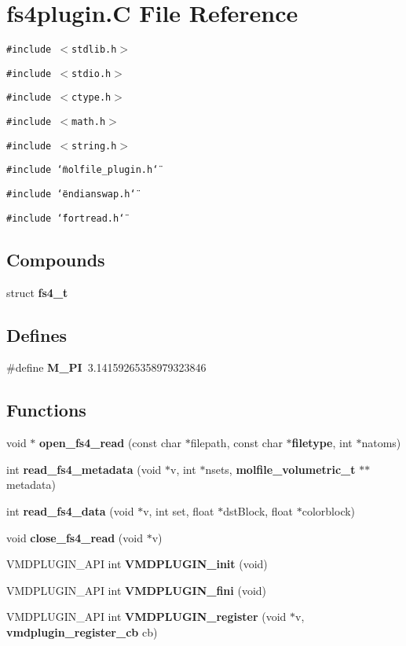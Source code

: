 \section{fs4plugin.C File Reference}
\label{fs4plugin_8C}
{\tt \#include $<$stdlib.h$>$}\par
{\tt \#include $<$stdio.h$>$}\par
{\tt \#include $<$ctype.h$>$}\par
{\tt \#include $<$math.h$>$}\par
{\tt \#include $<$string.h$>$}\par
{\tt \#include \char`\"{}molfile\_\-plugin.h\char`\"{}}\par
{\tt \#include \char`\"{}endianswap.h\char`\"{}}\par
{\tt \#include \char`\"{}fortread.h\char`\"{}}\par
\subsection*{Compounds}
\begin{CompactItemize}
\item 
struct {\bf fs4\_\-t}
\end{CompactItemize}
\subsection*{Defines}
\begin{CompactItemize}
\item 
\#define {\bf M\_\-PI}\ 3.14159265358979323846
\end{CompactItemize}
\subsection*{Functions}
\begin{CompactItemize}
\item 
void $\ast$ {\bf open\_\-fs4\_\-read} (const char $\ast$filepath, const char $\ast${\bf filetype}, int $\ast$natoms)
\item 
int {\bf read\_\-fs4\_\-metadata} (void $\ast$v, int $\ast$nsets, {\bf molfile\_\-volumetric\_\-t} $\ast$$\ast$metadata)
\item 
int {\bf read\_\-fs4\_\-data} (void $\ast$v, int set, float $\ast$dst\-Block, float $\ast$colorblock)
\item 
void {\bf close\_\-fs4\_\-read} (void $\ast$v)
\item 
VMDPLUGIN\_\-API int {\bf VMDPLUGIN\_\-init} (void)
\item 
VMDPLUGIN\_\-API int {\bf VMDPLUGIN\_\-fini} (void)
\item 
VMDPLUGIN\_\-API int {\bf VMDPLUGIN\_\-register} (void $\ast$v, {\bf vmdplugin\_\-register\_\-cb} cb)
\end{CompactItemize}
